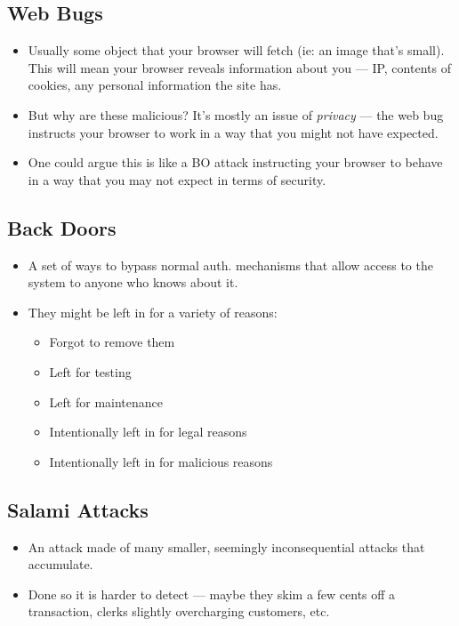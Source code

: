 \documentclass{article}
\begin{document}
\subsection{Web Bugs}
\begin{itemize}
    \item Usually some object that your browser will fetch (ie: an image that's small).  This will mean your browser reveals information about you --- IP, contents of cookies, any personal information the site has.
    \item But why are these malicious?  It's mostly an issue of \emph{privacy} --- the web bug instructs your browser to work in a way that you might not have expected.
    \item One could argue this is like a BO attack instructing your browser to behave in a way that you may not expect in terms of security.
\end{itemize}

\subsection{Back Doors}
\begin{itemize}
    \item A set of ways to bypass normal auth. mechanisms that allow access to the system to anyone who knows about it.
    \item They might be left in for a variety of reasons:
        \begin{itemize}
            \item Forgot to remove them
            \item Left for testing
            \item Left for maintenance
            \item Intentionally left in for legal reasons
            \item Intentionally left in for malicious reasons
        \end{itemize}
\end{itemize}

\subsection{Salami Attacks}
\begin{itemize}
    \item An attack made of many smaller, seemingly inconsequential attacks that accumulate.
    \item Done so it is harder to detect --- maybe they skim a few cents off a transaction, clerks slightly overcharging customers, etc.
\end{itemize}
\end{document}
